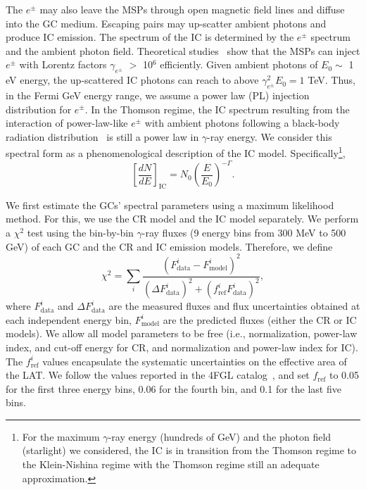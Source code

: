 \documentclass[doublespace,draft,nopageskip]{VTthesis} %
\begin{document}
The $e^\pm$ may also leave the MSPs through open magnetic field lines and diffuse into the GC medium. Escaping pairs may up-scatter ambient photons and produce IC emission. The spectrum of the IC is determined by the $e^\pm$ spectrum and the ambient photon field. Theoretical studies~\citep{2011ApJ...743..181H} show that the MSPs can inject $e^\pm$ with Lorentz factors $\gamma_{e^\pm}$ $>$ 10$^6$ efficiently. Given ambient photons of $ E_0\sim$ 1 eV energy, the up-scattered IC photons can reach to above $\gamma_{e^\pm}^2 E_0 = 1$ TeV. Thus, in the Fermi GeV energy range, we assume a power law (PL) injection distribution for $e^\pm$. In the Thomson regime, the IC spectrum resulting from the interaction of power-law-like $e^\pm$ with ambient photons following a black-body radiation distribution~\citep{1970RvMP...42..237B} is still a power law in $\gamma$-ray energy. We consider this spectral form as a phenomenological description of the IC model. Specifically\footnote{For the maximum $\gamma$-ray energy (hundreds of GeV) and the photon field (starlight) we considered, the IC is in transition from the Thomson regime to the Klein-Nishina regime with the Thomson regime still an adequate approximation.},
\begin{equation}\label{eq:PL}
    \left[ \frac{dN}{dE} \right]_{\mathrm{IC}} = N_0 \left(\frac{E}{E_0} \right)^{-\Gamma}.
\end{equation}

We first estimate the GCs' spectral parameters using a maximum likelihood method. For this, we use the CR model and the IC model separately. We perform a $\chi^2$ test using the bin-by-bin $\gamma$-ray fluxes (9 energy bins from 300 MeV to 500 GeV) of each GC and the CR and IC emission models. Therefore, we define 
\begin{equation}
    \chi^2=\sum_i\frac{(F_\text{data}^i-F_\text{model}^i)^2}{(\Delta F_\text{data}^i)^2+(f_\text{ref}^i F_\text{data}^i)^2},
\end{equation}
where $F_\mathrm{data}^i$ and $\Delta F_\mathrm{data}^i$ are the measured fluxes and flux uncertainties obtained at each independent energy bin,  $F_\mathrm{model}^i$ are the predicted fluxes (either the CR or IC models). We allow all model parameters to be free (i.e., normalization, power-law index, and cut-off energy for CR, and normalization and power-law index for IC). The $f_\text{ref}^i$ values encapsulate the systematic uncertainties on the effective area of the LAT. We follow the values reported in the 4FGL catalog~\citep{2020ApJS..247...33A}, and set $f_\text{ref}$ to 0.05 for the first three energy bins, 0.06 for the fourth bin, and 0.1 for the last five bins.
\end{document}
